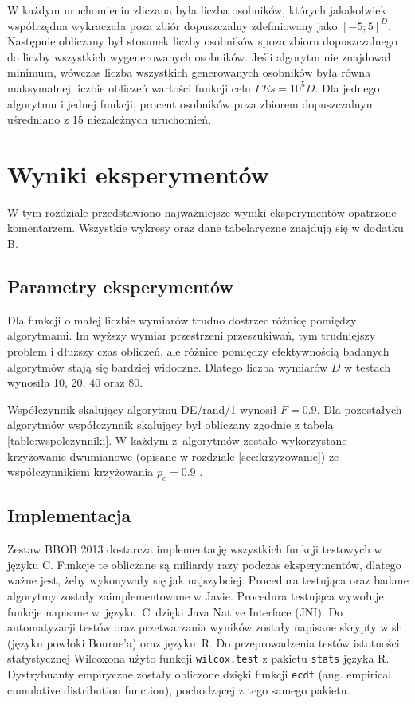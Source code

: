\documentclass[a4paper,onecolumn,oneside,12pt,wide,floatssmall]{mwrep}
\theoremstyle{definition}
\theoremstyle{plain}%
\theoremstyle{remark}
\begin{document}
W każdym uruchomieniu zliczana była liczba osobników, których jakakolwiek współrzędna wykraczała poza
zbiór dopuszczalny zdefiniowany jako $[-5; 5]^D$. Następnie obliczany był stosunek liczby 
osobników spoza zbioru dopuszczalnego do liczby wszystkich wygenerowanych osobników. Jeśli algorytm
nie znajdował minimum, wówczas liczba wszystkich generowanych osobników była równa maksymalnej
liczbie obliczeń wartości funkcji celu $FEs = 10^5D$. 
Dla jednego algorytmu i jednej funkcji, procent osobników
poza zbiorem dopuszczalnym uśredniano z 15 niezależnych uruchomień.

\chapter{Wyniki eksperymentów}

W tym rozdziale przedstawiono najważniejsze wyniki eksperymentów opatrzone komentarzem.
Wszystkie wykresy oraz dane tabelaryczne znajdują się w dodatku B.

\section{Parametry eksperymentów}

Dla funkcji o małej liczbie wymiarów trudno dostrzec różnicę pomiędzy algorytmami. 
Im wyższy wymiar przestrzeni przeszukiwań,
tym trudniejszy problem i dłuższy czas obliczeń, ale różnice pomiędzy efektywnością
badanych algorytmów stają się bardziej widoczne.
 Dlatego liczba wymiarów $D$ w testach wynosiła 10, 20, 40 oraz 80. 

Współczynnik skalujący algorytmu DE/rand/1 wynosił $F = 0.9$. 
Dla pozostałych algorytmów współczynnik skalujący był obliczany zgodnie z tabelą
\ref{table:wspolczynniki}.
W każdym z~algorytmów zostało wykorzystane krzyżowanie dwumianowe (opisane w rozdziale
\ref{sec:krzyzowanie}) ze
współczynnikiem krzyżowania $p_c = 0.9$ \cite{ronkkonen}.

\section{Implementacja}

Zestaw BBOB 2013 dostarcza implementację wszystkich funkcji testowych w języku C. Funkcje te obliczane
są miliardy razy podczas eksperymentów, dlatego ważne jest, żeby wykonywały się jak najszybciej.
Procedura testująca oraz badane algorytmy zostały zaimplementowane w 
Javie. Procedura testująca wywołuje funkcje napisane w~języku~C~dzięki Java Native Interface (JNI).
Do automatyzacji testów oraz przetwarzania wyników zostały napisane skrypty w sh 
(języku powłoki Bourne'a) oraz języku~R. Do przeprowadzenia testów istotności statystycznej Wilcoxona 
użyto funkcji \texttt{wilcox.test} z pakietu \texttt{stats} języka R. Dystrybuanty empiryczne
zostały obliczone dzięki funkcji \texttt{ecdf} (ang. empirical cumulative distribution function),
pochodzącej z tego samego pakietu.
\end{document}
